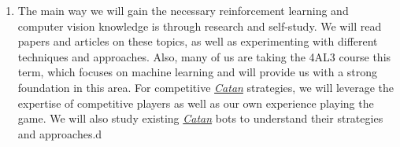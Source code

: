 \documentclass{article}
\newcommand{\Catan}{\href{https://en.wikipedia.org/wiki/Catan}{Catan}}
\begin{document}
\begin{enumerate}
    \item The main way we will gain the necessary reinforcement learning and computer vision
    knowledge is through research and self-study. We will read papers and articles on these topics,
    as well as experimenting with different techniques and approaches. Also, many of us are taking
    the 4AL3 course this term, which focuses on machine learning and will provide us with a strong
    foundation in this area. For competitive \emph{\Catan{}} strategies, we will leverage the expertise of
    competitive players as well as our own experience playing the game. We will also study existing \emph{\Catan{}} bots
    to understand their strategies and approaches.d

\end{enumerate}
\end{document}
